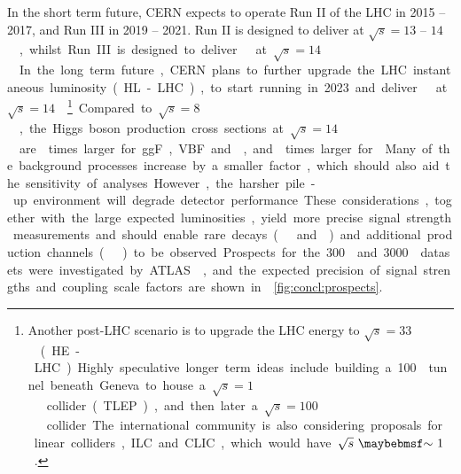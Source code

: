 
In the short term future, CERN expects to operate Run II of the LHC in 2015 -- 2017, and 
Run III in 2019 -- 2021. Run II is designed to deliver \unit{}{\invfb} at 
\unit{$\sqrt{s} = 13\text{ -- }14$}{\TeV}, whilst Run III is designed to deliver 
\unit{}{\invfb} at \unit{$\sqrt{s} = 14$}{\TeV}. In the long term future, CERN 
plans to further upgrade the LHC instantaneous luminosity (HL-LHC), to start running in 
2023 and deliver \unit{}{\invfb} at \unit{$\sqrt{s} = 14$}{\TeV}.\footnote{
	Another post-LHC scenario is to upgrade the LHC energy to \unit{$\sqrt{s} = 33$}{\TeV} 
	(HE-LHC). Highly speculative longer term ideas include building a 
	\unit{100}{\kilo\metre} tunnel beneath Geneva to house a \unit{$\sqrt{s} = 1$}{\TeV} 
	\epluseminus collider (TLEP), and then later a \unit{$\sqrt{s} = 100$}{\TeV} \pp 
	collider. The international community is also considering proposals for \epluseminus 
	linear colliders, ILC and CLIC, which would have \unit{$\sqrt{s}~\about~1$}{\TeV}.
}

Compared to \unit{$\sqrt{s} = 8$}{\TeV}, the Higgs boson production cross sections at 
\unit{$\sqrt{s} = 14$}{\TeV} are  times larger for ggF, VBF and \VH, and 
 times larger for \ttH. Many of the background processes increase by a smaller 
factor, which should also aid the sensitivity of analyses. However, the harsher pile-up 
environment will degrade detector performance. These considerations, together with the 
large expected luminosities, yield more precise signal strength measurements and should 
enable rare decays (\eg \HepProcess{\PHiggs \HepTo \PZ\Pphoton} and \HepProcess{\PHiggs 
\HepTo \Pmu\Pmu}) and additional production channels (\eg \ttH) to be observed. Prospects 
for the \unit{300}{\invfb} and \unit{3000}{\invfb} datasets were investigated by ATLAS 
\cite{ATLAS:prospects}, and the expected precision of signal strengths and coupling scale 
factors are shown in \Figure~\ref{fig:concl:prospects}.

